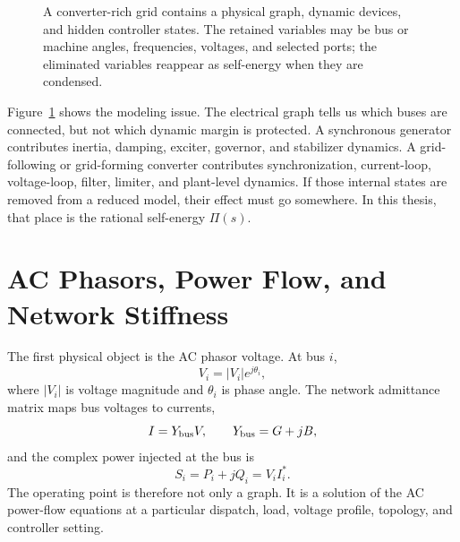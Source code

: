 \begin{figure}[ht]
{}
\caption{A converter-rich grid contains a physical graph, dynamic devices, and
hidden controller states. The retained variables may be bus or machine angles,
frequencies, voltages, and selected ports; the eliminated variables reappear as
self-energy when they are condensed.}
\label{fig:framework_networked_grid}
\end{figure}

Figure~\ref{fig:framework_networked_grid} shows the modeling issue. The
electrical graph tells us which buses are connected, but not which dynamic
margin is protected. A synchronous generator contributes inertia, damping,
exciter, governor, and stabilizer dynamics. A grid-following or grid-forming
converter contributes synchronization, current-loop, voltage-loop, filter,
limiter, and plant-level dynamics. If those internal states are removed from a
reduced model, their effect must go somewhere. In this thesis, that place is
the rational self-energy \(\Pi(s)\).

\section{AC Phasors, Power Flow, and Network Stiffness}

The first physical object is the AC phasor voltage. At bus \(i\),
\begin{equation}
  V_i=|V_i|e^{j\theta_i},
  \label{eq:framework_phasor}
\end{equation}
where \(|V_i|\) is voltage magnitude and \(\theta_i\) is phase angle. The
network admittance matrix maps bus voltages to currents,
\begin{equation}
  I=Y_{\rm bus}V,\qquad Y_{\rm bus}=G+jB,
  \label{eq:framework_ybus}
\end{equation}
and the complex power injected at the bus is
\begin{equation}
  S_i=P_i+jQ_i=V_iI_i^* .
  \label{eq:framework_complex_power}
\end{equation}
The operating point is therefore not only a graph. It is a solution of the AC
power-flow equations at a particular dispatch, load, voltage profile, topology,
and controller setting.

